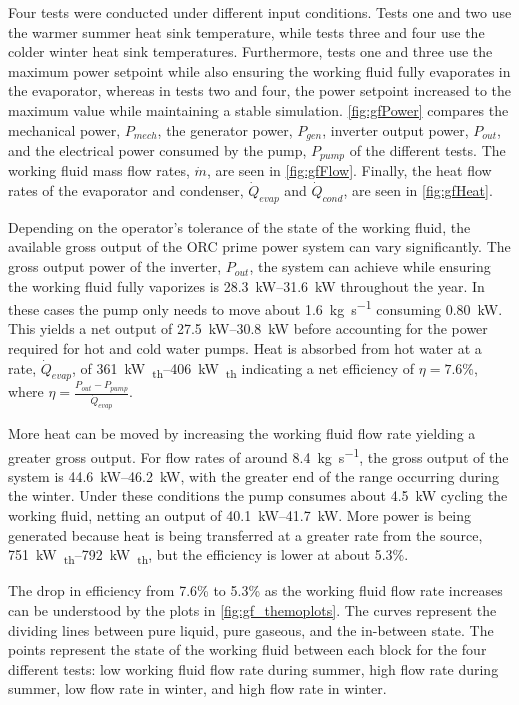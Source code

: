 Four tests were conducted under different input conditions. Tests one and two use the warmer summer heat sink temperature, while tests three and four use the colder winter heat sink temperatures. Furthermore, tests one and three use the maximum power setpoint while also ensuring the working fluid fully evaporates in the evaporator, whereas in tests two and four, the power setpoint increased to the maximum value while maintaining a stable simulation. \autoref{fig:gfPower} compares the mechanical power, $P_{mech}$, the generator power, $P_{gen}$, inverter output power, $P_{out}$, and the electrical power consumed by the pump, $P_{pump}$ of the different tests. The working fluid mass flow rates, $\dot{m}$, are seen in \autoref{fig:gfFlow}. Finally, the heat flow rates of the evaporator and condenser, $\dot{Q}_{evap}$ and $\dot{Q}_{cond}$, are seen in \autoref{fig:gfHeat}.




Depending on the operator's tolerance of the state of the working fluid, the available gross output of the ORC prime power system can vary significantly. The gross output power of the inverter, $P_{out}$, the system can achieve while ensuring the working fluid fully vaporizes is \SIrange{28.3}{31.6}{\kilo\watt} throughout the year. In these cases the pump only needs to move about \SI{1.6}{\kilogram\per\second} consuming \SI{0.80}{\kilo\watt}. This yields a net output of \SIrange{27.5}{30.8}{\kilo\watt} before accounting for the power required for hot and cold water pumps. Heat is absorbed from hot water at a rate, $\dot{Q}_{evap}$, of \SIrange{361}{406}{\kilo\watt\textsubscript{th}} indicating a net efficiency of $\eta = 7.6\%$, where $\eta = \frac{P_{out}-P_{pump}}{\dot{Q}_{evap}}$.

More heat can be moved by increasing the working fluid flow rate yielding a greater gross output. For flow rates of around \SI{8.4}{\kilogram\per\second}, the gross output of the system is \SIrange{44.6}{46.2}{\kilo\watt}, with the greater end of the range occurring during the winter. Under these conditions the pump consumes about \SI{4.5}{\kilo\watt} cycling the working fluid, netting an output of \SIrange{40.1}{41.7}{\kilo\watt}. More power is being generated because heat is being transferred at a greater rate from the source, \SIrange{751}{792}{\kilo\watt\textsubscript{th}}, but the efficiency is lower at about 5.3\%.

The drop in efficiency from 7.6\% to 5.3\% as the working fluid flow rate increases can be understood by the plots in \autoref{fig:gf_themoplots}. The curves represent the dividing lines between pure liquid, pure gaseous, and the in-between state. The points represent the state of the working fluid between each block for the four different tests: low working fluid flow rate during summer, high flow rate during summer, low flow rate in winter, and high flow rate in winter. 


